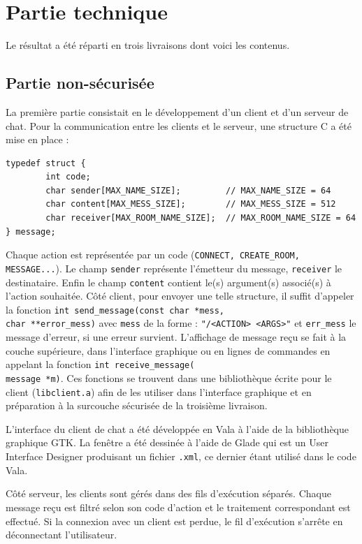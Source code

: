 \documentclass[a4paper,11pt,french]{book}
\begin{document}
\section{Partie technique}

Le résultat a été réparti en trois livraisons dont voici les contenus.

\subsection{Partie non-sécurisée}
La première partie consistait en le développement d'un client et d'un serveur de chat. 
Pour la communication entre les clients et le serveur, une structure C a été mise en place :

\begin{verbatim}
typedef struct {
        int code;
        char sender[MAX_NAME_SIZE];         // MAX_NAME_SIZE = 64
        char content[MAX_MESS_SIZE];        // MAX_MESS_SIZE = 512
        char receiver[MAX_ROOM_NAME_SIZE];  // MAX_ROOM_NAME_SIZE = 64
} message;
\end{verbatim}

Chaque action est représentée par un code (\verb+CONNECT, CREATE_ROOM, MESSAGE...+). Le champ \verb+sender+ représente l'émetteur du message, \verb+receiver+ le destinataire. Enfin le champ \verb+content+ contient le(s) argument(s) associé(s) à l'action souhaitée. Côté client, pour envoyer une telle structure, il suffit d'appeler la fonction \verb+int send_message(const char *mess,+\\ \verb+char **error_mess)+ avec \verb+mess+ de la forme : \verb+"/<ACTION> <ARGS>"+ et \verb+err_mess+ le message d'erreur, si une erreur survient. L'affichage de message reçu se fait à la couche supérieure, dans l'interface graphique ou en lignes de commandes en appelant la fonction \verb+int receive_message(+\\\verb+message *m)+. Ces fonctions se trouvent dans une bibliothèque écrite pour le client (\verb+libclient.a+) afin de les utiliser dans l'interface graphique et en préparation à la surcouche sécurisée de la troisième livraison. 

L'interface du client de chat a été développée en Vala à l'aide de la bibliothèque graphique GTK. La fenêtre a été dessinée à l'aide de Glade qui est un User Interface Designer produisant un fichier \verb+.xml+, ce dernier étant utilisé dans le code Vala.

Côté serveur, les clients sont gérés dans des fils d'exécution séparés. Chaque message reçu est filtré selon son code d'action et le traitement correspondant est effectué. Si la connexion avec un client est perdue, le fil d'exécution s'arrête en déconnectant l'utilisateur.
\end{document}
